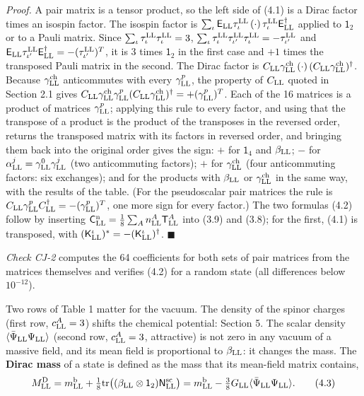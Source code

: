 \documentclass[
  10pt,
]{article}
\begin{document}
\emph{Proof.} A pair matrix is a tensor product, so the left side of
(4.1) is a Dirac factor times an isospin factor. The isospin factor is
\(\sum_\iota\mathsf E_{\rm LL}\tau^{\rm LL}_\iota\,(\cdot)\,\tau^{\rm LL}_\iota\mathsf E_{\rm LL}^\dagger\)
applied to \(\mathsf 1_2\) or to a Pauli matrix. Since
\(\sum_\iota\tau^{\rm LL}_\iota\tau^{\rm LL}_\iota=3\),
\(\sum_\iota\tau^{\rm LL}_\iota\tau^{\rm LL}_{\iota'}\tau^{\rm LL}_\iota=-\tau^{\rm LL}_{\iota'}\)
and
\(\mathsf E_{\rm LL}\tau^{\rm LL}_{\iota'}\mathsf E_{\rm LL}^\dagger=-(\tau^{\rm LL}_{\iota'})^T\),
it is 3 times \(\mathsf 1_2\) in the first case and \(+1\) times the
transposed Pauli matrix in the second. The Dirac factor is
\(C_{\rm LL}\gamma^{\rm ch}_{\rm LL}\,(\cdot)\,(C_{\rm LL}\gamma^{\rm ch}_{\rm LL})^\dagger\).
Because \(\gamma^{\rm ch}_{\rm LL}\) anticommutes with every
\(\gamma^p_{\rm LL}\), the property of \(C_{\rm LL}\) quoted in Section
2.1 gives
\(C_{\rm LL}\gamma^{\rm ch}_{\rm LL}\gamma^p_{\rm LL}(C_{\rm LL}\gamma^{\rm ch}_{\rm LL})^\dagger=+(\gamma^p_{\rm LL})^T\).
Each of the 16 matrices is a product of matrices \(\gamma^p_{\rm LL}\);
applying this rule to every factor, and using that the transpose of a
product is the product of the transposes in the reversed order, returns
the transposed matrix with its factors in reversed order, and bringing
them back into the original order gives the sign: \(+\) for
\(\mathsf 1_4\) and \(\beta_{\rm LL}\); \(-\) for
\(\alpha^j_{\rm LL}=\gamma^0_{\rm LL}\gamma^j_{\rm LL}\) (two
anticommuting factors); \(+\) for \(\gamma^{\rm ch}_{\rm LL}\) (four
anticommuting factors: six exchanges); and for the products with
\(\beta_{\rm LL}\) or \(\gamma^{\rm ch}_{\rm LL}\) in the same way, with
the results of the table. (For the pseudoscalar pair matrices the rule
is
\(C_{\rm LL}\gamma^p_{\rm LL}C_{\rm LL}^\dagger=-(\gamma^p_{\rm LL})^T\),
one more sign for every factor.) The two formulas (4.2) follow by
inserting
\(\mathsf C^{\rm n}_{\rm LL}=\tfrac18\sum_An^A_{\rm LL}\mathsf T^A_{\rm LL}\)
into (3.9) and (3.8); for the first, (4.1) is transposed, with
\((\mathsf K^\iota_{\rm LL})^*=-(\mathsf K^\iota_{\rm LL})^\dagger\).
\(\blacksquare\)

\emph{Check CJ-2} computes the 64 coefficients for both sets of pair
matrices from the matrices themselves and verifies (4.2) for a random
state (all differences below \(10^{-12}\)).

Two rows of Table 1 matter for the vacuum. The density of the spinor
charges (first row, \(c^A_{\rm LL}=3\)) shifts the chemical potential:
Section 5. The scalar density
\(\langle\bar\Psi_{\rm LL}\Psi_{\rm LL}\rangle\) (second row,
\(c^A_{\rm LL}=3\), attractive) is not zero in any vacuum of a massive
field, and its mean field is proportional to \(\beta_{\rm LL}\): it
changes the mass. The \textbf{Dirac mass} of a state is defined as the
mass that its mean-field matrix contains,
\[M^{\rm D}_{\rm LL}=m^{\rm b}_{\rm LL}+\tfrac18\mathrm{tr}\big((\beta_{\rm LL}\otimes\mathsf 1_2)\mathsf N^{\rm sc}_{\rm LL}\big)
=m^{\rm b}_{\rm LL}-\tfrac38G_{\rm LL}\langle\bar\Psi_{\rm LL}\Psi_{\rm LL}\rangle.\tag{4.3}\]
\end{document}
